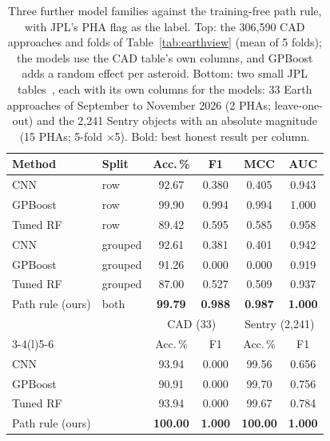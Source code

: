 \documentclass[make,article,submit,moreauthors]{Definitions/mdpi}
\begin{document}
\begin{table}[t]
\centering
\footnotesize
\caption{Three further model families against the training-free path rule, with JPL's PHA flag as the label. Top: the 306,590 CAD approaches and folds of Table~\ref{tab:earthview} (mean of 5 folds); the models use the CAD table's own columns, and GPBoost adds a random effect per asteroid. Bottom: two small JPL tables~\cite{jpl_cad_api,jpl_sentry_api}, each with its own columns for the models: 33 Earth approaches of September to November 2026 (2 PHAs; leave-one-out) and the 2,241 Sentry objects with an absolute magnitude (15 PHAs; 5-fold $\times$5). Bold: best honest result per column.}
\label{tab:sheet}
\setlength{\tabcolsep}{2.2pt}
\begin{tabular}{@{}llcccc@{}}
\toprule
Method & Split & Acc.\,\% & F1 & MCC & AUC \\
\midrule
CNN & row & 92.67 & 0.380 & 0.405 & 0.943 \\
GPBoost & row & 99.90 & 0.994 & 0.994 & 1.000 \\
Tuned RF & row & 89.42 & 0.595 & 0.585 & 0.958 \\
CNN & grouped & 92.61 & 0.381 & 0.401 & 0.942 \\
GPBoost & grouped & 91.26 & 0.000 & 0.000 & 0.919 \\
Tuned RF & grouped & 87.00 & 0.527 & 0.509 & 0.937 \\
Path rule (ours) & both & \textbf{99.79} & \textbf{0.988} & \textbf{0.987} & \textbf{1.000} \\
\midrule
 & & \multicolumn{2}{c}{CAD (33)} & \multicolumn{2}{c}{Sentry (2,241)} \\
\cmidrule(lr){3-4}\cmidrule(l){5-6}
 & & Acc.\,\% & F1 & Acc.\,\% & F1 \\
CNN & & 93.94 & 0.000 & 99.56 & 0.656 \\
GPBoost & & 90.91 & 0.000 & 99.70 & 0.756 \\
Tuned RF & & 93.94 & 0.000 & 99.67 & 0.784 \\
Path rule (ours) & & \textbf{100.00} & \textbf{1.000} & \textbf{100.00} & \textbf{1.000} \\
\bottomrule
\end{tabular}
\end{table}
\end{document}
